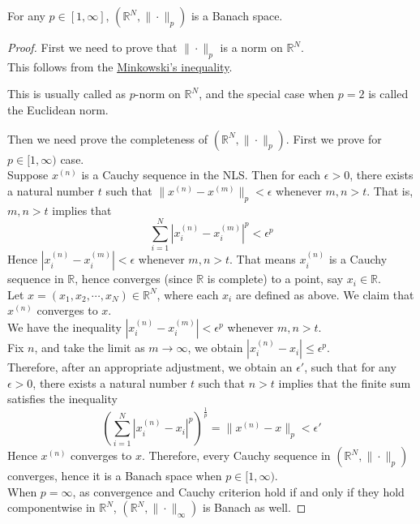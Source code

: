 \begin{eg}
    For any $p\in[1,\infty]$, $(\mathbb{R}^{N},\|\cdot\|_{p})$ is a Banach space.
    \begin{proof}
        First we need to prove that $\|\cdot\|_{p}$ is a norm on $\mathbb{R}^{N}$.\\ 
        This follows from the \hyperlink{minkowski}{Minkowski's inequality}.
        \begin{note}
            This is usually called as $p$-norm on $\mathbb{R}^{N}$, and the special case when $p=2$ is called the Euclidean norm.
        \end{note}
        Then we need prove the completeness of $(\mathbb{R}^{N},\|\cdot\|_{p})$. First we prove for $p\in[1,\infty)$ case.\\
        Suppose $x^{(n)}$ is a Cauchy sequence in the NLS. Then for each $\epsilon>0$, there exists a natural number $t$ such that $\|x^{(n)}-x^{(m)}\|_{p}<\epsilon$ whenever $m,n>t$. That is, $m,n>t$ implies that $$\sum_{i=1}^{N}\left|x^{(n)}_{i}-x_{i}^{(m)}\right|^{p}<\epsilon^{p}$$
        Hence $\left|x_{i}^{(n)}-x_{i}^{(m)}\right|<\epsilon$ whenever $m,n>t$. That means $x_{i}^{(n)}$ is a Cauchy sequence in $\mathbb{R}$, hence converges (since $\mathbb{R}$ is complete) to a point, say $x_{i}\in \mathbb{R}$.\\
        Let $x=(x_{1},x_{2},\cdots,x_{N})\in \mathbb{R}^{N}$, where each $x_{i}$ are defined as above. We claim that $x^{(n)}$ converges to $x$.\\ 
        We have the inequality $|x_{i}^{(n)}-x_{i}^{(m)}|<\epsilon^{p}$ whenever $m,n>t$.\\ 
        Fix $n$, and take the limit as $m\to\infty$, we obtain $|x_{i}^{(n)}-x_{i}|\leq\epsilon^{p}$.\\ 
        Therefore, after an appropriate adjustment, we obtain an $\epsilon'$, such that for any $\epsilon>0$, there exists a natural number $t$ such that $n>t$ implies that the finite sum satisfies the inequality $$\left(\sum_{i=1}^{N}\left|x_{i}^{(n)}-x_{i}\right|^{p}\right)^{\frac{1}{p}}=\|x^{(n)}-x\|_{p}<\epsilon'$$
        Hence $x^{(n)}$ converges to $x$.
        Therefore, every Cauchy sequence in $(\mathbb{R}^{N},\|\cdot\|_{p})$ converges, hence it is a Banach space when $p\in[1,\infty)$.\\ 
        When $p=\infty$, as convergence and Cauchy criterion hold if and only if they hold componentwise in $\mathbb{R}^{N}$, $(\mathbb{R}^{N},\|\cdot\|_{\infty})$ is Banach as well.
    \end{proof}
\end{eg}

